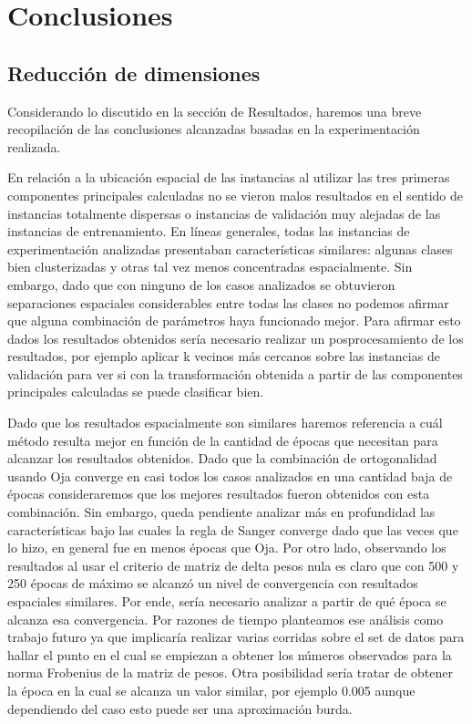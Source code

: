\documentclass[informe.tex]{subfiles}
\begin{document}
  
  \section{Conclusiones}

    \subsection{Reducción de dimensiones}
      Considerando lo discutido en la sección de Resultados, haremos una breve recopilación de las conclusiones alcanzadas basadas en la experimentación realizada. 
      
      En relación a la ubicación espacial de las instancias al utilizar las tres primeras componentes principales calculadas no se vieron malos resultados en el sentido de instancias totalmente dispersas o instancias de validación muy alejadas de las instancias de entrenamiento. En líneas generales, todas las instancias de experimentación analizadas presentaban características similares: algunas clases bien clusterizadas y otras tal vez menos concentradas espacialmente. Sin embargo, dado que con ninguno de los casos analizados se obtuvieron separaciones espaciales considerables entre todas las clases no podemos afirmar que alguna combinación de parámetros haya funcionado mejor. Para afirmar esto dados los resultados obtenidos sería necesario realizar un posprocesamiento de los resultados, por ejemplo aplicar k vecinos más cercanos sobre las instancias de validación para ver si con la transformación obtenida a partir de las componentes principales calculadas se puede clasificar bien.
      
      Dado que los resultados espacialmente son similares haremos referencia a cu\'al m\'etodo resulta mejor en funci\'on de la cantidad de \'epocas que necesitan para alcanzar los resultados obtenidos. Dado que la combinación de ortogonalidad usando Oja converge en casi todos los casos analizados en una cantidad baja de épocas consideraremos que los mejores resultados fueron obtenidos con esta combinación. Sin embargo, queda pendiente analizar más en profundidad las características bajo las cuales la regla de Sanger converge dado que las veces que lo hizo, en general fue en menos épocas que Oja. Por otro lado, observando los resultados al usar el criterio de matriz de delta pesos nula es claro que con 500 y 250 \'epocas de máximo se alcanzó un nivel de convergencia con resultados espaciales similares. Por ende, sería necesario analizar a partir de qué época se alcanza esa convergencia. Por razones de tiempo planteamos ese análisis como trabajo futuro ya que implicaría realizar varias corridas sobre el set de datos para hallar el punto en el cual se empiezan a obtener los números observados para la norma Frobenius de la matriz de pesos. Otra posibilidad sería tratar de obtener la época en la cual se alcanza un valor similar, por ejemplo 0.005 aunque dependiendo del caso esto puede ser una aproximación burda.
      
\end{document}
